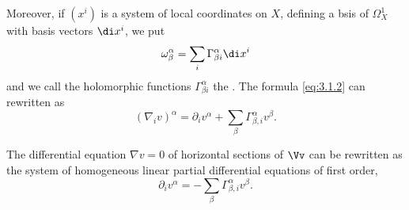 \begin{para}
  Moreover, if $(x^i)$ is a system of local coordinates on $X$, defining a bsis
  of $\Omega_X^1$ with basis vectors $\di x^i$, we put
  \[
  \omega^\alpha_\beta = \sum_{i}\Gamma^\alpha_{\beta i}\di x^i
  \]
  and we call the holomorphic functions $\Gamma^{\alpha}_{\beta i}$
  the .
  The formula \cref{eq:3.1.2} can rewritten as
  \begin{equation}
    (\nabla_i v)^\alpha =
    \partial_iv^\alpha + \sum_\beta\Gamma^\alpha_{\beta,i}v^\beta.
  \end{equation}

  The differential equation $\nabla v = 0$ of horizontal sections of $\Vv$ can
  be rewritten as the system of
  homogeneous linear partial differential equations of first order,
  \begin{equation}\label{eq:3.1.5}
    \partial_iv^\alpha = - \sum_\beta\Gamma^\alpha_{\beta,i}v^\beta.
  \end{equation}
\end{para}

